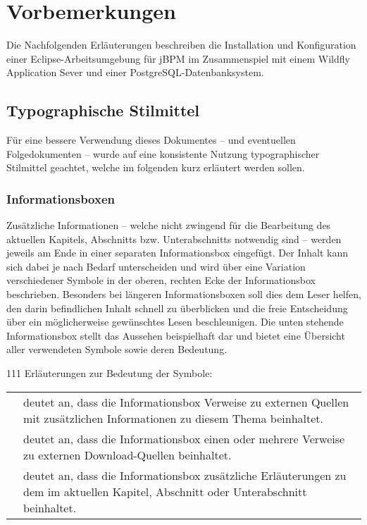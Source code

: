 \section{Vorbemerkungen}
Die Nachfolgenden Erläuterungen beschreiben die Installation und Konfiguration einer Eclipse-Arbeitsumgebung für jBPM im Zusammenspiel mit einem Wildfly Application Sever und einer PostgreSQL-Datenbanksystem.

\subsection{Typographische Stilmittel}
Für eine bessere Verwendung dieses Dokumentes -- und eventuellen Folgedokumenten -- wurde auf eine konsistente Nutzung typographischer Stilmittel geachtet, welche im folgenden kurz erläutert werden sollen.

\subsubsection{Informationsboxen}
Zusätzliche Informationen -- welche nicht zwingend für die Bearbeitung des aktuellen Kapitels, Abschnitts bzw. Unterabschnitts notwendig sind -- werden jeweils am Ende in einer separaten Informationsbox eingefügt. Der Inhalt kann sich dabei je nach Bedarf unterscheiden und wird über eine Variation verschiedener Symbole in der oberen, rechten Ecke der Informationsbox beschrieben. Besonders bei längeren Informationsboxen soll dies dem Leser helfen, den darin befindlichen Inhalt schnell zu überblicken und die freie Entscheidung über ein möglicherweise gewünschtes Lesen beschleunigen. Die unten stehende Informationsbox stellt das Aussehen beispielhaft dar und bietet eine Übersicht aller verwendeten Symbole sowie deren Bedeutung.
\begin{info}{111}
	Erläuterungen zur Bedeutung der Symbole:\\[1em]
	\begin{tabular}{m{2em}m{}}
	\bookmarkicon	& deutet an, dass die Informationsbox Verweise zu externen Quellen mit zusätzlichen Informationen zu diesem Thema beinhaltet. \\[0.5em] 
	\downloadicon	& deutet an, dass die Informationsbox einen oder mehrere Verweise zu externen Download-Quellen beinhaltet. \\[0.5em]
	\fileicon	& deutet an, dass die Informationsbox zusätzliche Erläuterungen zu dem im aktuellen Kapitel, Abschnitt oder Unterabschnitt beinhaltet.
	\end{tabular}
\end{info}
